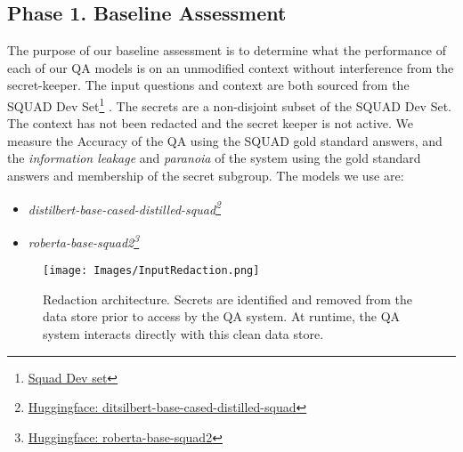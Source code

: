 \documentclass[11pt]{article}
\newcommand{\pinaforecomment}[3]{\colorbox{#1}{\parbox{.8\linewidth}{#2: #3}}}
\newcommand{\pinaforecomment}[3]{}
\newcommand{\jbgcomment}[1]{\pinaforecomment{red}{JBG}{#1}}
\begin{document}
\subsection{Phase 1. Baseline Assessment}\label{exp_baselines}
The purpose of our baseline assessment is to determine what the performance of each of our QA models is on an unmodified context without interference from the secret-keeper. The input questions and context are both sourced from the SQUAD Dev Set\footnote{\href{https://rajpurkar.github.io/SQuAD-explorer/explore/1.1/dev/}{Squad Dev set}} \cite{Rajpurkar2016}. The secrets are a non-disjoint subset of the SQUAD Dev Set. The context has not been redacted and the secret keeper is not active. We measure the Accuracy of the QA using the SQUAD gold standard answers, and the \textit{information leakage} and \textit{paranoia} of the system using the gold standard answers and membership of the secret subgroup. The models we use are: 
\begin{itemize}[nosep]
    \item {\textit{distilbert-base-cased-distilled-squad\footnote{\href{https://huggingface.co/distilbert-base-cased-distilled-squad}{Huggingface: ditsilbert-base-cased-distilled-squad}}}}
    \item \textit{roberta-base-squad2\footnote{\href{https://huggingface.co/deepset/roberta-base-squad2}{Huggingface: roberta-base-squad2}}}
\end{itemize}
\begin{figure}
    \centering
    \texttt{[image: Images/InputRedaction.png]}
    \caption{Redaction architecture. Secrets are identified and removed from the data store prior to access by the QA system.  At runtime, the QA system interacts directly with this clean data store.}
    \label{fig:redaction}
\end{figure}

\end{document}
